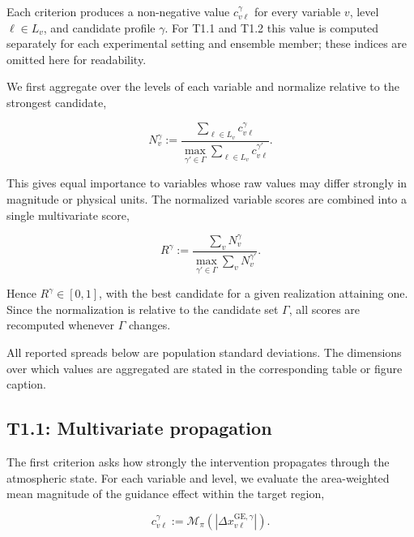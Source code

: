 Each criterion produces a non-negative value $c_{v\ell}^{\gamma}$ for every
variable $v$, level $\ell\in L_v$, and candidate profile $\gamma$. For T1.1
and T1.2 this value is computed separately for each experimental setting and
ensemble member; these indices are omitted here for readability.

We first aggregate over the levels of each variable and normalize relative to
the strongest candidate,

\begin{equation}
    N_v^\gamma
    :=
    \frac{
        \displaystyle
        \sum_{\ell\in L_v}
        c_{v\ell}^{\gamma}
    }{
        \displaystyle
        \max_{\gamma'\in\Gamma}
        \sum_{\ell\in L_v}
        c_{v\ell}^{\gamma'}
    }.
    \label{eq:t1-variable-score}
\end{equation}

This gives equal importance to variables whose raw values may differ strongly
in magnitude or physical units. The normalized variable scores are combined
into a single multivariate score,

\begin{equation}
    R^\gamma
    :=
    \frac{
        \displaystyle
        \sum_{v} N_v^\gamma
    }{
        \displaystyle
        \max_{\gamma'\in\Gamma}
        \sum_v N_v^{\gamma'}
    }.
    \label{eq:t1-single-score}
\end{equation}

Hence $R^\gamma\in[0,1]$, with the best candidate for a given realization
attaining one. Since the normalization is relative to the candidate set
$\Gamma$, all scores are recomputed whenever $\Gamma$ changes.

All reported spreads below are population standard deviations. The dimensions
over which values are aggregated are stated in the corresponding table or
figure caption.


\subsection{T1.1: Multivariate propagation}
\label{sec:multivariate-propagation}

The first criterion asks how strongly the intervention propagates through the
atmospheric state. For each variable and level, we evaluate the area-weighted
mean magnitude of the guidance effect within the target region,

\begin{equation}
    c_{v\ell}^{\gamma}
    :=
    \mathcal{M}_{\pi}
    \left(
        \left|
            \Delta x_{v\ell}^{\mathrm{GE},\gamma}
        \right|
    \right).
    \label{eq:t1-propagation}
\end{equation}

